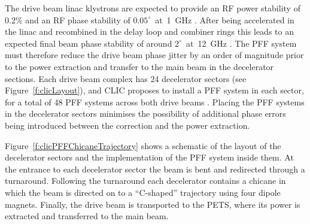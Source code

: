 The drive beam linac klystrons are expected to provide an RF power stability of 0.2\% and an RF phase stability of \(0.05^\circ\)~at~1~GHz \cite{clicCDR}. After being accelerated in the linac and recombined in the delay loop and combiner rings this leads to an expected final beam phase stability of around \(2^\circ\)~at~12~GHz \cite{clicCDR}. The PFF system must therefore reduce the drive beam phase jitter by an order of magnitude prior to the power extraction and transfer to the main beam in the decelerator sections. Each drive beam complex has 24 decelerator sectors (see Figure~\ref{f:clicLayout}), and CLIC proposes to install a PFF system in each sector, for a total of 48 PFF systems across both drive beams \cite{clicCDR}. Placing the PFF systems in the decelerator sectors minimises the possibility of additional phase errors being introduced between the correction and the power extraction.


Figure~\ref{f:clicPFFChicaneTrajectory} shows a schematic of the layout of the decelerator sectors and the implementation of the PFF system inside them. At the entrance to each decelerator sector the beam is bent and redirected through a turnaround. Following the turnaround each decelerator contains a chicane in which the beam is directed on to a ``C-shaped'' trajectory using four dipole magnets. Finally, the drive beam is transported to the PETS, where its power is extracted and transferred to the main beam.

